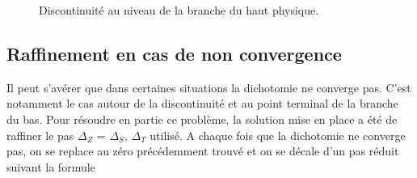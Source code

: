 \documentclass[a4paper,12pt]{article}
\begin{document}
            
            \begin{figure}
              \centering
              \hspace{5pt}
              \caption{Discontinuité au niveau de la branche du haut physique.}
              \label{Fig:Discontinuity}
            \end{figure}
            
          \subsection{Raffinement en cas de non convergence}
            Il peut s'avérer que dans certaines situations la dichotomie ne converge pas. C'est notamment le cas autour de la discontinuité et au point terminal de la branche du bas. Pour résoudre en partie ce problème, la solution mise en place a été de raffiner le pas $\Delta_Z$ = $\Delta_S$, $\Delta_T$ utilisé. A chaque fois que la dichotomie ne converge pas, on se replace au zéro précédemment trouvé et on se décale d'un pas réduit suivant la formule
            
\end{document}
